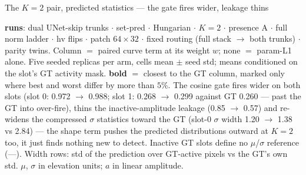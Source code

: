 \begin{frame}{The $K{=}2$ pair, predicted statistics --- the gate fires wider, leakage thins}
  \parbox{0.82\textwidth}{\tiny\color{soft} \textbf{runs}: dual UNet-skip trunks $\cdot$ set-pred $\cdot$ Hungarian $\cdot$ $K{=}2$ $\cdot$ presence A $\cdot$ full norm ladder $\cdot$ hv flips $\cdot$ patch $64{\times}32$ $\cdot$ fixed routing (full stack $\to$ both trunks) $\cdot$ parity twins. Column $=$ paired curve term at its weight $w$; none $=$ param-L1 alone. Five seeded replicas per arm, cells mean $\pm$ seed std; means conditioned on the slot's GT activity mask. \textbf{bold} $=$ closest to the \textcolor{good}{GT} column, marked only where best and worst differ by more than $5\%$. The cosine gate fires wider on both slots (slot 0: 0.972 $\to$ 0.988; slot 1: 0.268 $\to$ 0.299 against GT 0.260 --- past the GT into over-fire), thins the inactive-amplitude leakage (0.85 $\to$ 0.57) and re-widens the compressed $\sigma$ statistics toward the GT (slot-0 $\sigma$ width 1.20 $\to$ 1.38 vs 2.84) --- the shape term pushes the predicted distributions outward at $K{=}2$ too, it just finds nothing new to detect. Inactive GT slots define no $\mu$/$\sigma$ reference (---). Width rows: std of the prediction over GT-active pixels vs the GT's own std. $\mu$, $\sigma$ in elevation units; $a$ in linear amplitude.\par}
\end{frame}

